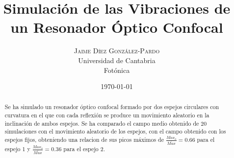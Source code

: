\documentclass[twoside]{article}
\title{
		\vspace{-15mm}
		\fontsize{28pt}{10pt}
		\selectfont\textbf{Simulación de las Vibraciones de un Resonador Óptico Confocal}%
	}
\author{
		\large
		\textsc{Jaime D\'iez Gonz\'alez-Pardo}\\[4mm]
		\fontsize{28pt}{10pt} Universidad de Cantabria \\ %
		\normalsize Fotónica \\ 
	}
\date{ \today }
\begin{document}
		\maketitle %


		\thispagestyle{fancy} %


		\begin{abstract}

			\noindent%

				Se ha simulado un resonador óptico confocal formado por dos espejos circulares con curvatura en el que con cada reflexión se produce un movimiento aleatorio en la inclinación de ambos espejos. Se ha comparado el campo medio obtenido de 20 simulaciones con el movimiento aleatorio de los espejos, con el campo obtenido con los espejos fijos, obteniendo una relacion de sus picos máximos de $\frac {Max_o}{\overline{Max}} = 0.66$ para el espejo 1 y $\frac{Max_o}{\overline{Max}} = 0.36$ para el espejo 2.

		\end{abstract}

\end{document}
